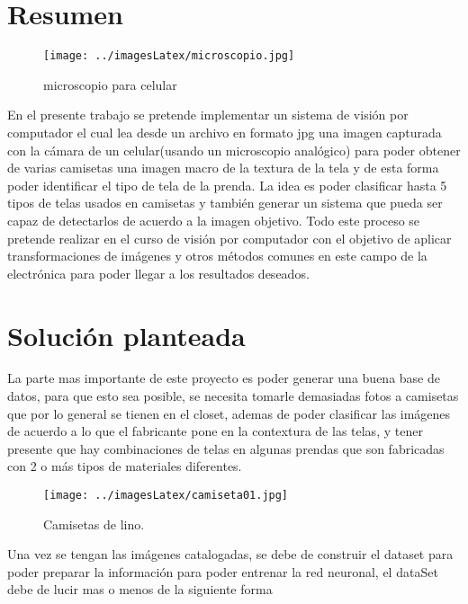 \documentclass{article}
\begin{document}
\section{Resumen}

\begin{figure}[ht]
    \centering
    \texttt{[image: ../imagesLatex/microscopio.jpg]} 
    \caption{ microscopio para celular }
    \label{fig:1}
\end{figure}

En el presente trabajo se pretende implementar un sistema de visión por computador el cual lea desde un archivo en formato jpg 
una imagen capturada con la cámara de un celular(usando un microscopio analógico) para poder obtener de varias camisetas una
imagen macro de la textura de la tela y de esta forma poder identificar el tipo de tela de la prenda.  La idea es poder clasificar 
hasta 5 tipos de telas usados en camisetas y también generar un sistema que pueda ser capaz de detectarlos de acuerdo a la imagen objetivo.
Todo este proceso se pretende realizar en el curso de visión por computador con el objetivo de aplicar transformaciones de imágenes y otros
métodos comunes en este campo de la electrónica para poder llegar a los resultados deseados.


\section{Solución planteada}

La parte mas importante de este proyecto es poder generar una buena base de datos, para que esto sea posible,
se necesita tomarle demasiadas fotos a camisetas que por lo general se tienen en el closet, ademas de poder clasificar
las imágenes de acuerdo a lo que el fabricante pone en la contextura de las telas, y tener presente que hay combinaciones
de telas en algunas prendas que son fabricadas con 2 o más tipos de materiales diferentes.

\vspace{1cm}
\begin{figure}[htbp]
    \centering
    \texttt{[image: ../imagesLatex/camiseta01.jpg]} 
    \caption{Camisetas de lino.}
    \label{fig:2}
\end{figure}

Una vez se tengan las imágenes catalogadas, se debe de construir el dataset para poder preparar la información para poder entrenar la 
red neuronal, el dataSet debe de lucir mas o menos de la siguiente forma
\end{document}
